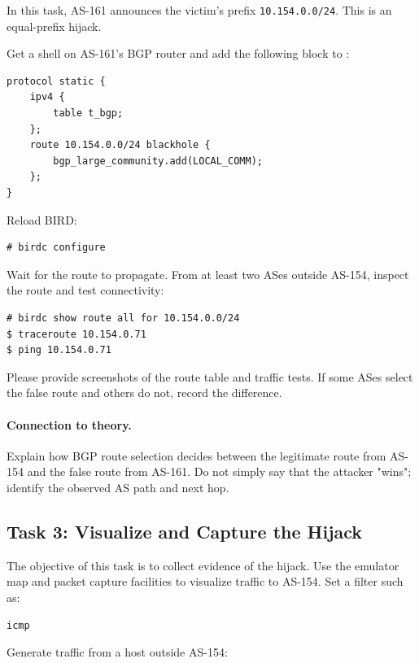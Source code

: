 In this task, AS-161 announces the victim's prefix
\texttt{10.154.0.0/24}. This is an equal-prefix hijack.

Get a shell on AS-161's BGP router and add the following block to
:

\begin{lstlisting}
protocol static {
    ipv4 {
        table t_bgp;
    };
    route 10.154.0.0/24 blackhole {
        bgp_large_community.add(LOCAL_COMM);
    };
}
\end{lstlisting}

Reload BIRD:

\begin{lstlisting}
# birdc configure
\end{lstlisting}

Wait for the route to propagate. From at least two ASes outside AS-154, inspect
the route and test connectivity:

\begin{lstlisting}
# birdc show route all for 10.154.0.0/24
$ traceroute 10.154.0.71
$ ping 10.154.0.71
\end{lstlisting}

Please provide screenshots of the route table and traffic tests. If some ASes
select the false route and others do not, record the difference.

\paragraph{Connection to theory.}
Explain how BGP route selection decides between the legitimate route from
AS-154 and the false route from AS-161. Do not simply say that the attacker
"wins"; identify the observed AS path and next hop.


\subsection{Task 3: Visualize and Capture the Hijack}

The objective of this task is to collect evidence of the hijack. Use the
emulator map and packet capture facilities to visualize traffic to AS-154.
Set a filter such as:

\begin{lstlisting}
icmp
\end{lstlisting}

Generate traffic from a host outside AS-154:


